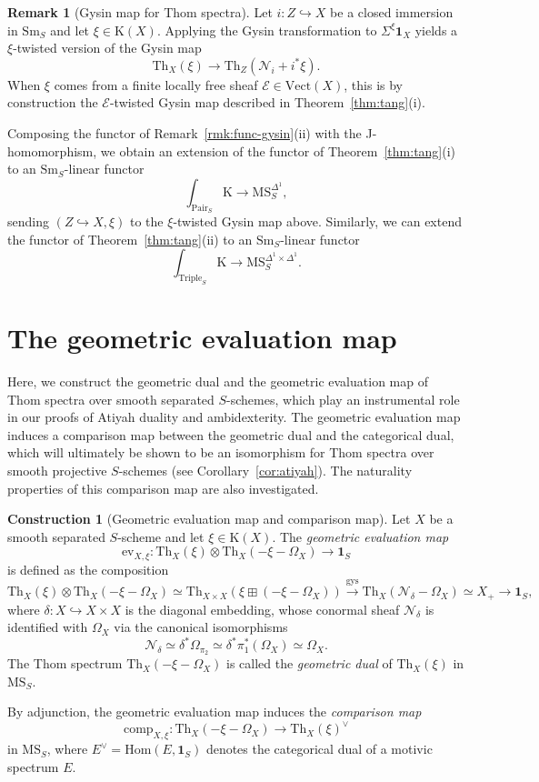 \documentclass{amsart}
\numberwithin{equation}{section}
\theoremstyle{plain}
\theoremstyle{definition}
\newtheorem{construction}[equation]{Construction}
\newtheorem{remark}[equation]{Remark}
\let\scr=\mathcal
\let\rm=\mathrm
\def\1{\mathbf 1}
\let\into=\hookrightarrow
\def\Hom{\mathrm{Hom}}
\def\Th{\mathrm{Th}}
\let\cat=\mathrm
\def\K{\mathrm{K}{}}
\def\Sm{{\cat{S}\mathrm{m}}}
\def\Vect{\cat{V}\mathrm{ect}{}}
\def\Pair{\mathrm{Pair}}
\def\MS{\mathrm{MS}}
\def\ev{\mathrm{ev}}
\def\gys{\mathrm{gys}{}}
\begin{document}
\begin{remark}[Gysin map for Thom spectra]
	\label{rmk:gysin-thom}
	Let $i\colon Z\into X$ be a closed immersion in $\Sm_S$ and let $\xi\in\K(X)$. Applying the Gysin transformation to $\Sigma^{\xi}\1_X$ yields a $\xi$-twisted version of the Gysin map
	\[
	\Th_X(\xi) \to \Th_Z(\scr N_i+i^*\xi).
	\]
	When $\xi$ comes from a finite locally free sheaf $\scr E\in\Vect(X)$, this is by construction the $\scr E$-twisted Gysin map described in Theorem~\ref{thm:tang}(i).
	
	Composing the functor of Remark~\ref{rmk:func-gysin}(ii) with the J-homomorphism, we obtain an extension of the functor of Theorem~\ref{thm:tang}(i) to an $\Sm_S$-linear functor
	\[
	\int_{\Pair_S}\K\to \MS_S^{\Delta^1},
	\]
	sending $(Z\into X,\xi)$ to the $\xi$-twisted Gysin map above.
	Similarly, we can extend the functor of Theorem~\ref{thm:tang}(ii) to an $\Sm_S$-linear functor
	\[
	\int_{\mathrm{Triple}_S}\K\to \MS_S^{\Delta^1\times\Delta^1}.
	\]
\end{remark}



\section{The geometric evaluation map}
\label{sec:eval}

Here, we construct the geometric dual and the geometric evaluation map of Thom spectra over smooth separated $S$-schemes, which play an instrumental role in our proofs of Atiyah duality and ambidexterity. The geometric evaluation map induces a comparison map between the geometric dual and the categorical dual, which will ultimately be shown to be an isomorphism for Thom spectra over smooth projective $S$-schemes (see Corollary~\ref{cor:atiyah}). The naturality properties of this comparison map are also investigated.

\begin{construction}[Geometric evaluation map and comparison map]
\label{ctr:ev}
Let $X$ be a smooth separated $S$-scheme and let $\xi\in\K(X)$.
The \emph{geometric evaluation map}
\[
\ev_{X,\xi}\colon \Th_X(\xi)\otimes \Th_X(-\xi-\Omega_X) \to\1_S
\] 
is defined as the composition
\[
\Th_X(\xi)\otimes \Th_X(-\xi-\Omega_X) \simeq \Th_{X\times X}(\xi\boxplus (-\xi-\Omega_X)) \xrightarrow{\gys} \Th_X(\scr N_{\delta}-\Omega_X) \simeq X_+ \to\1_S,
\]
where $\delta\colon X\into X\times X$ is the diagonal embedding, whose conormal sheaf $\scr N_\delta$ is identified with $\Omega_X$ via the canonical isomorphisms \[\scr N_\delta\simeq \delta^*\Omega_{\pi_2}\simeq \delta^*\pi_1^*(\Omega_X)\simeq\Omega_X.\]
The Thom spectrum $\Th_X(-\xi - \Omega_X)$ is called the \emph{geometric dual} of $\Th_X(\xi)$ in $\MS_S$.

By adjunction, the geometric evaluation map induces the \emph{comparison map}
\begin{equation*}
\rm{comp}_{X,\xi} \colon \Th_X(- \xi - \Omega_X) \to \Th_X(\xi)^\vee
\end{equation*}
in $\MS_S$, where $E^\vee=\Hom(E,\1_S)$ denotes the categorical dual of a motivic spectrum $E$.
\end{construction}
\end{document}
